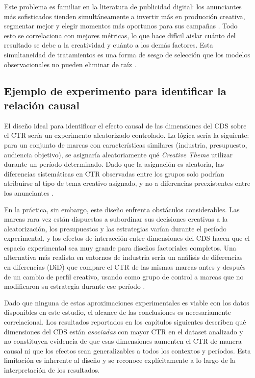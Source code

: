 \documentclass[12pt, a4paper]{report}
\begin{document}
Este problema es familiar en la literatura de publicidad digital: los anunciantes más sofisticados
tienden simultáneamente a invertir más en producción creativa, segmentar mejor y elegir momentos
más oportunos para sus campañas \citep{yang2025}. Todo esto se correlaciona con mejores métricas,
lo que hace difícil aislar cuánto del resultado se debe a la creatividad y cuánto a los demás
factores. Esta simultaneidad de tratamientos es una forma de sesgo de selección que los modelos
observacionales no pueden eliminar de raíz \citep{cunningham2021}.

\subsection{Ejemplo de experimento para identificar la relación causal}

El diseño ideal para identificar el efecto causal de las dimensiones del CDS sobre el CTR sería un
experimento aleatorizado controlado. La lógica sería la siguiente: para un conjunto de marcas con
características similares (industria, presupuesto, audiencia objetivo), se asignaría aleatoriamente
qué \textit{Creative Theme} utilizar durante un período determinado. Dado que la asignación es
aleatoria, las diferencias sistemáticas en CTR observadas entre los grupos solo podrían atribuirse
al tipo de tema creativo asignado, y no a diferencias preexistentes entre los anunciantes
\citep{cunningham2021}.

En la práctica, sin embargo, este diseño enfrenta obstáculos considerables. Las marcas rara vez
están dispuestas a subordinar sus decisiones creativas a la aleatorización, los presupuestos y las
estrategias varían durante el período experimental, y los efectos de interacción entre dimensiones
del CDS hacen que el espacio experimental sea muy grande para diseños factoriales completos. Una
alternativa más realista en entornos de industria sería un análisis de diferencias en diferencias
(DiD) que compare el CTR de las mismas marcas antes y después de un cambio de perfil creativo,
usando como grupo de control a marcas que no modificaron su estrategia durante ese período
\citep{cunningham2021}.

Dado que ninguna de estas aproximaciones experimentales es viable con los datos disponibles en este
estudio, el alcance de las conclusiones es necesariamente correlacional. Los resultados reportados
en los capítulos siguientes describen qué dimensiones del CDS están \textit{asociadas} con mayor
CTR en el dataset analizado y no constituyen evidencia de que esas dimensiones aumenten el CTR de
manera causal ni que los efectos sean generalizables a todos los contextos y períodos. Esta
limitación es inherente al diseño y se reconoce explícitamente a lo largo de la interpretación
de los resultados.
\end{document}

